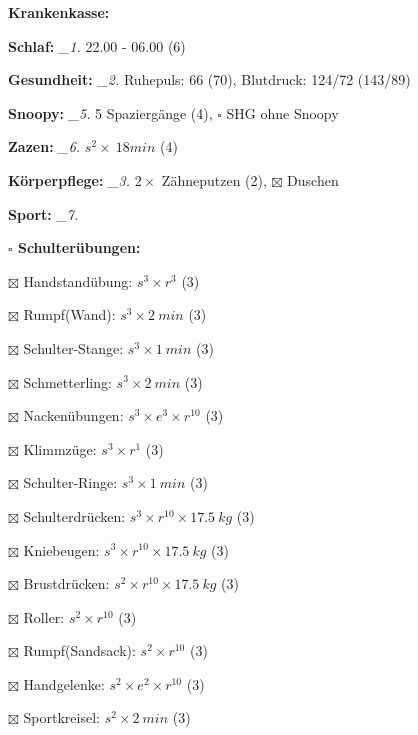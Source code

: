 \documentclass[10pt,a4paper]{article}
\newcommand\prop[1] {{\color {alizarin} {\bf #1}}}             %
\newcommand\mand[1] {{\color {burntorange} {\bf #1}}}          %
\newcommand\topspace{\vskip -15pt \hskip 20pt}
\newcommand\n[1] { {\sl #1.} \hskip 5pt }
\begin{document}
\begin{mdframed}[style=daystyle]
  \begin{labeling}{{\mand {Krankenkasse:}}}
    \setlength\itemsep{-3pt}
  \item[{\mand {Schlaf:}}]        \n{\_1} 22.00 - 06.00 (6)
  \item[{\mand {Gesundheit:}}]    \n{\_2} Ruhepuls: 66 (70), Blutdruck: 124/72 (143/89)
  \item[{\mand {Snoopy:}}]        \n{\_5} 5 Spaziergänge (4), $\square$ SHG ohne Snoopy
  \item[{\mand {Zazen:}}]         \n{\_6} $s^2 \times\ 18 min$ (4)
  \item[{\mand {Körperpflege:}}]  \n{\_3} $2 \times$ Zähneputzen (2), $\boxtimes$ Duschen
  \item[{\mand {Sport:}}]         \n{\_7}
    \topspace
    \begin{minipage}{0.75\textwidth}  
      \begin{labeling}{\prop {$\square$ {Schulterübungen:}}} 
        \setlength\itemsep{-3pt}
      \item[$\boxtimes$ Handstandübung:]  $s^3 \times r^{3}$ (3)
      \item[$\boxtimes$ Rumpf(Wand):]     $s^3 \times 2\ min$ (3)
      \item[$\boxtimes$ Schulter-Stange:] $s^3 \times 1\ min$ (3)
      \item[$\boxtimes$ Schmetterling:]   $s^3 \times 2\ min$ (3)
      \item[$\boxtimes$ Nackenübungen:]   $s^3 \times e^3 \times r^{10}$ (3)
      \item[$\boxtimes$ Klimmzüge:]       $s^3 \times r^1$ (3)
      \item[$\boxtimes$ Schulter-Ringe:]  $s^3 \times 1\ min$ (3)
      \item[$\boxtimes$ Schulterdrücken:] $s^3 \times r^{10} \times 17.5\ kg$ (3)
      \item[$\boxtimes$ Kniebeugen:]      $s^3 \times r^{10} \times 17.5\ kg$ (3)
      \item[$\boxtimes$ Brustdrücken:]    $s^2 \times r^{10} \times 17.5\ kg$ (3)
      \item[$\boxtimes$ Roller:]          $s^2 \times r^{10}$ (3)
      \item[$\boxtimes$ Rumpf(Sandsack):] $s^2 \times r^{10}$ (3)
      \item[$\boxtimes$ Handgelenke:]     $s^2 \times e^2 \times r^{10}$ (3)
      \item[$\boxtimes$ Sportkreisel:]    $s^2 \times 2\ min$ (3)

\end{labeling}
\end{minipage}
\end{labeling}
\end{mdframed}
\end{document}
